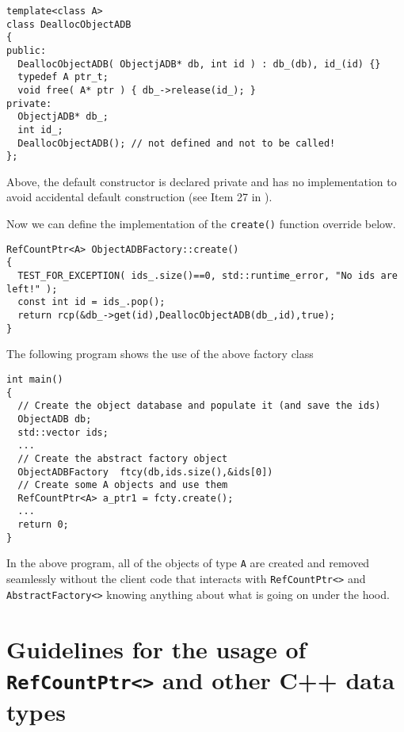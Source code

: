 {\scriptsize\begin{verbatim}
template<class A>
class DeallocObjectADB
{
public:
  DeallocObjectADB( ObjectjADB* db, int id ) : db_(db), id_(id) {}
  typedef A ptr_t;
  void free( A* ptr ) { db_->release(id_); }
private:
  ObjectjADB* db_;
  int id_;
  DeallocObjectADB(); // not defined and not to be called!
};
\end{verbatim}}

{}\noindent{}Above, the default constructor is declared private and
has no implementation to avoid accidental default construction (see
Item 27 in {}\cite{ref:meyers_1994}).

Now we can define the implementation of the {}\texttt{create()} function
override below.

{\scriptsize\begin{verbatim}
RefCountPtr<A> ObjectADBFactory::create()
{
  TEST_FOR_EXCEPTION( ids_.size()==0, std::runtime_error, "No ids are left!" );
  const int id = ids_.pop();
  return rcp(&db_->get(id),DeallocObjectADB(db_,id),true);
}
\end{verbatim}}

The following program shows the use of the above factory class

{\scriptsize\begin{verbatim}
int main()
{
  // Create the object database and populate it (and save the ids)
  ObjectADB db;
  std::vector ids;
  ...
  // Create the abstract factory object
  ObjectADBFactory  ftcy(db,ids.size(),&ids[0])
  // Create some A objects and use them
  RefCountPtr<A> a_ptr1 = fcty.create();
  ...
  return 0;
}
\end{verbatim}}

In the above program, all of the objects of type {}\texttt{A} are
created and removed seamlessly without the client code that interacts
with {}\texttt{Ref\-Count\-Ptr<>} and {}\texttt{AbstractFactory<>}
knowing anything about what is going on under the hood.

%
\section{Guidelines for the usage of {}\texttt{Ref\-Count\-Ptr<>} and other C++ data types}
%

